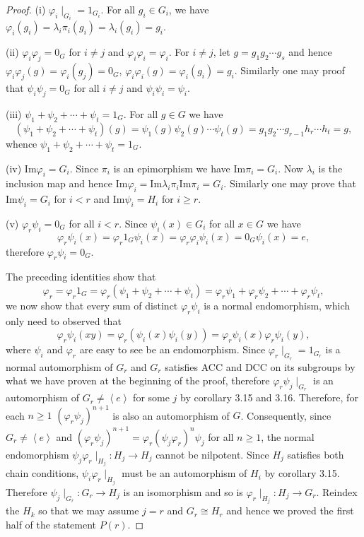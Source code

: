 \begin{proof}
(i) $\varphi_i\mid_{G_i}=1_{G_i}$. For all $g_i\in G_i$, we have $\varphi_i(g_i)=\lambda_i\pi_i(g_i)=\lambda_i(g_i)=g_i$.\par
(ii) $\varphi_i\varphi_j=0_G$ for $i\ne j$ and $\varphi_i\varphi_i=\varphi_i$. For $i\ne j$, let $g=g_1g_2\cdots g_s$ and hence $\varphi_i\varphi_j(g)=\varphi_i(g_j)=0_G$, $\varphi_i\varphi_i(g)=\varphi_i(g_i)=g_i$. Similarly one may proof that $\psi_i\psi_j=0_G$ for all $i\ne j$ and $\psi_i\psi_i=\psi_i$.\par
(iii) $\psi_1+\psi_2+\cdots+\psi_t=1_G$. For all $g\in G$ we have 
$$(\psi_1+\psi_2+\cdots+\psi_t)(g)=\psi_1(g)\psi_2(g)\cdots\psi_t(g)=g_1g_2\cdots g_{r-1}h_r\cdots h_t=g,$$
whence $\psi_1+\psi_2+\cdots+\psi_t=1_G$.\par
(iv) $\mathrm{Im}\varphi_i=G_i$. Since $\pi_i$ is an epimorphism we have $\mathrm{Im}\pi_i=G_i$. Now $\lambda_i$ is the inclusion map and hence $\mathrm{Im}\varphi_i=\mathrm{Im}\lambda_i\pi_i\mathrm{Im}\pi_i=G_i$. Similarly one may prove that $\mathrm{Im}\psi_i=G_i$ for $i<r$ and $\mathrm{Im}\psi_i=H_i$ for $i\ge r$.\par
(v) $\varphi_r\psi_i=0_G$ for all $i<r$. Since $\psi_i(x)\in G_i$ for all $x\in G$ we have 
$$\varphi_r\psi_i(x)=\varphi_r1_G\psi_i(x)=\varphi_r\varphi_i\psi_i(x)=0_G\psi_i(x)=e,$$
therefore $\varphi_r\psi_i=0_G$.\par
The preceding identities show that 
$$\varphi_r=\varphi_r1_G=\varphi_r(\psi_1+\psi_2+\cdots+\psi_t)=\varphi_r\psi_1+\varphi_r\psi_2+\cdots+\varphi_r\psi_t,$$
we now show that every sum of distinct $\varphi_r\psi_i$ is a normal endomorphism, which only need to observed that 
$$
\varphi _r\psi _i\left( xy \right) =\varphi _r\left( \psi _i\left( x \right) \psi _i\left( y \right) \right) =\varphi _r\psi _i\left( x \right) \varphi _r\psi _i\left( y \right) ,
$$
where $\psi_i$ and $\varphi_r$ are easy to see be an endomorphism. Since $\varphi_r\mid_{G_r}=1_{G_r}$ is a normal automorphism of $G_r$ and $G_r$ satisfies ACC and DCC on its subgroups by what we have proven at the beginning of the proof, therefore $\varphi_r\psi_j\mid_{G_r}$ is an automorphism of $G_r\ne\left<e\right>$ for some $j$ by corollary 3.15 and 3.16. Therefore, for each $n\ge 1$ $(\varphi_r\psi_j)^{n+1}$ is also an automorphism of $G$. Consequently, since $G_r\ne\left<e\right>$ and $(\varphi_r\psi_j)^{n+1}=\varphi_r(\psi_j\varphi_r)^n\psi_j$ for all $n\ge 1$, the normal endomorphism $\psi_j\varphi_r\mid_{H_j}:H_j\to H_j$ cannot be nilpotent. Since $H_j$ satisfies both chain conditions, $\psi_i\varphi_r\mid_{H_j}$ must be an automorphism of $H_i$ by corollary 3.15. Therefore $\psi_j\mid_{G_r}:G_r\to H_j$ is an isomorphism and so is $\varphi_r\mid_{H_j}:H_j\to G_r$. Reindex the $H_k$ so that we may assume $j=r$ and $G_r\cong H_r$ and hence we proved the first half of the statement $P(r)$.\par

\end{proof}
